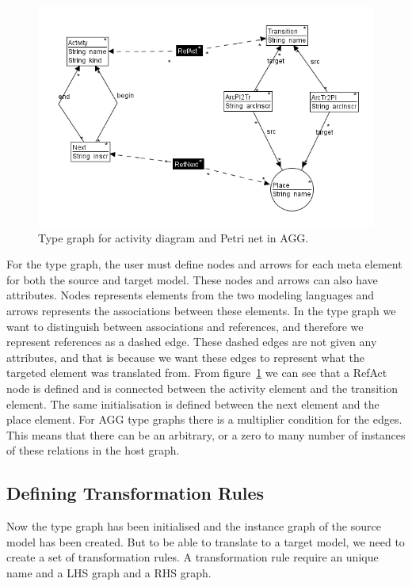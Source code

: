 \begin{figure}[H]
	\centering
	\includegraphics[scale=0.7]{figures/AggTypeGraph.png}
	\caption[Type graph in AGG]
	{Type graph for activity diagram and Petri net in AGG.}
	\label{fig:AggTypeGraph}
\end{figure}

For the type graph, the user must define nodes and arrows for each meta
element for both the source and target model. These nodes and arrows can also
have attributes. Nodes represents elements from the two modeling languages and
arrows represents the associations between these elements. In the type graph we
want to distinguish between associations and references, and therefore we
represent references as a dashed edge. These dashed edges are not given any
attributes, and that is because we want these edges to represent what the
targeted element was translated from. From figure~\ref{fig:AggTypeGraph} we can
see that a RefAct node is defined and is connected between the activity
element and the transition element. The same initialisation is defined between
the next element and the place element. For AGG type graphs there is a
multiplier condition for the edges. This means that there can be an arbitrary,
or a zero to many number of instances of these relations in the host graph.

\subsection{Defining Transformation Rules}
Now the type graph has been initialised and the instance graph of the
source model has been created. But to be able to translate to a target model,
we need to create a set of transformation rules. A transformation rule
require an unique name and a LHS graph and a RHS graph. 

